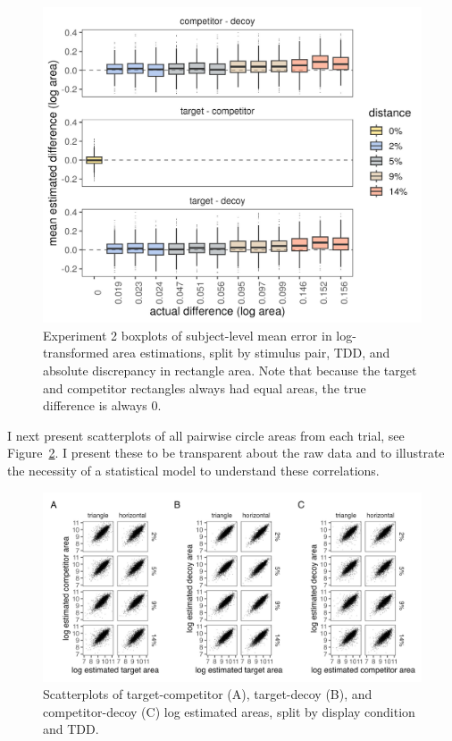 \begin{figure}
   \includegraphics[width=\textwidth]{figures/circleAreaPhase_boxplot_meanlogdiffs_no_outliers.jpeg}
   \caption{Experiment 2 boxplots of subject-level mean error in log-transformed area estimations, split by stimulus pair, TDD, and absolute discrepancy in rectangle area. Note that because the target and competitor rectangles always had equal areas, the true difference is always 0.}
   \label{fig:circle_boxplots}
\end{figure}

I next present scatterplots of all pairwise circle areas from each trial, see Figure~\ref{fig:raw_cors}. I present these to be transparent about the raw data and to illustrate the necessity of a statistical model to understand these correlations. 

\begin{figure}
   \includegraphics[width=\textwidth]{figures/circleAreaPhase_cor_plot_all_no_outliers.jpg}
   \caption{Scatterplots of target-competitor (A), target-decoy (B), and competitor-decoy (C) log estimated areas, split by display condition and TDD.}
   \label{fig:raw_cors}
\end{figure}

